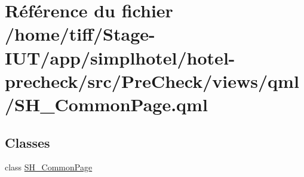 \hypertarget{SH__CommonPage_8qml}{\section{Référence du fichier /home/tiff/\-Stage-\/\-I\-U\-T/app/simplhotel/hotel-\/precheck/src/\-Pre\-Check/views/qml/\-S\-H\-\_\-\-Common\-Page.qml}
\label{SH__CommonPage_8qml}
}
\subsection*{Classes}
\begin{DoxyCompactItemize}
\item 
class \hyperlink{classSH__CommonPage}{S\-H\-\_\-\-Common\-Page}
\end{DoxyCompactItemize}
